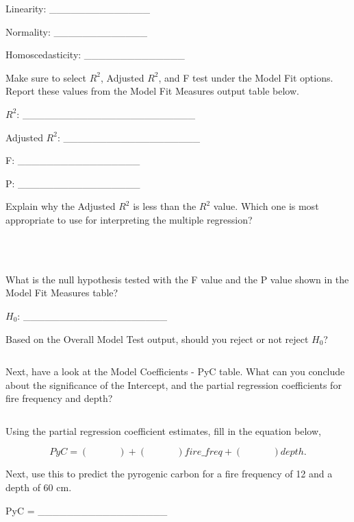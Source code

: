 \documentclass[
]{scrbook}
\begin{document}
Linearity: \_\_\_\_\_\_\_\_\_\_\_\_\_\_

Normality: \_\_\_\_\_\_\_\_\_\_\_\_\_

Homoscedasticity: \_\_\_\_\_\_\_\_\_\_\_\_\_\_

Make sure to select \(R^{2}\), Adjusted \(R^{2}\), and F test under the Model Fit options.
Report these values from the Model Fit Measures output table below.

\(R^{2}\): \_\_\_\_\_\_\_\_\_\_\_\_\_\_\_\_\_\_\_\_\_\_\_\_

Adjusted \(R^{2}\): \_\_\_\_\_\_\_\_\_\_\_\_\_\_\_\_\_\_\_

F: \_\_\_\_\_\_\_\_\_\_\_\_\_\_\_\_\_

P: \_\_\_\_\_\_\_\_\_\_\_\_\_\_\_\_\_

Explain why the Adjusted \(R^{2}\) is less than the \(R^{2}\) value.
Which one is most appropriate to use for interpreting the multiple regression?

\begin{verbatim}



\end{verbatim}

What is the null hypothesis tested with the F value and the P value shown in the Model Fit Measures table?

\(H_{0}\): \_\_\_\_\_\_\_\_\_\_\_\_\_\_\_\_\_\_\_\_

Based on the Overall Model Test output, should you reject or not reject \(H_{0}\)?

\begin{verbatim}
\end{verbatim}

Next, have a look at the Model Coefficients - PyC table.
What can you conclude about the significance of the Intercept, and the partial regression coefficients for fire frequency and depth?

\begin{verbatim}

\end{verbatim}

Using the partial regression coefficient estimates, fill in the equation below,

\[PyC = (\:\:\:\:\:\:\:\:\:\:\:\:\:\:) + (\:\:\:\:\:\:\:\:\:\:\:\:\:\:)fire\_freq + (\:\:\:\:\:\:\:\:\:\:\:\:\:\:)depth.\]

Next, use this to predict the pyrogenic carbon for a fire frequency of 12 and a depth of 60 cm.

PyC = \_\_\_\_\_\_\_\_\_\_\_\_\_\_\_\_\_\_
\end{document}
